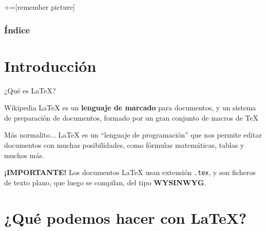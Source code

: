 \documentclass[9pt,xcolor=svgnames]{beamer}
\begin{document}
+=[remember picture]
\everymath{\displaystyle}

\begin{frame}
 \titlepage
\end{frame}

\normalsize

\begin{frame}
 \frametitle{Índice} 
 \transboxin
 \tableofcontents
\end{frame}
  
  
 \section{Introducción}

 \begin{frame}{¿Qué es \LaTeX?}
   \begin{block}{Wikipedia}
     \noindent \LaTeX{} es un \textbf{lenguaje de marcado} para
     documentos, y un sistema de preparación de documentos, formado
     por un gran conjunto de macros de \TeX{}
   \end{block}

   \pause

   \begin{block}{Más normalito...}
     \noindent \LaTeX{} es un ``lenguaje de programación'' que nos
     permite editar documentos con muchas posibilidades, como fórmulas
     matemáticas, tablas y muchos más.
   \end{block}

   \pause
   
   \begin{block}{\textbf{¡IMPORTANTE!}}
     \noindent Los documentos \LaTeX{} usan extensión \texttt{.tex}, y
     son ficheros de texto plano, que luego se compilan, del tipo
     \textbf{WYSINWYG}.
   \end{block}
   
 \end{frame}

 \section{¿Qué podemos hacer con \LaTeX?}
 
\end{document}
